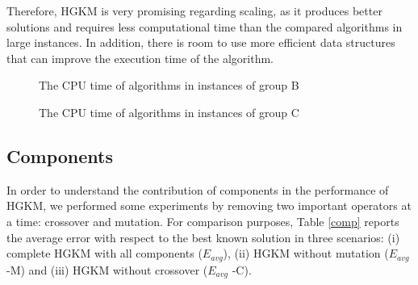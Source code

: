 Therefore, HGKM is very promising regarding scaling, as it produces better solutions and requires less computational time than the compared algorithms in large instances. In addition, there is room to use more efficient data structures that can improve the execution time of the algorithm.


\begin{figure}[H]
\centering
{}
\caption{The CPU time of algorithms in instances of group B}
\label{fig:sizeB}
\end{figure}

\begin{figure}[H]
\centering
{}
\caption{The CPU time of algorithms in instances of group C}
\label{fig:sizeC}
\end{figure}

\subsection{Components}
\label{sec:components-section}
In order to understand the contribution of components in the performance of HGKM, we performed some experiments by removing two important operators at a time: crossover and mutation. For comparison purposes, Table \ref{comp} reports the average error with respect to the best known solution in three scenarios: (i) complete HGKM with all components ($E_{avg}$), (ii) HGKM without mutation ($E_{avg}$ -M) and (iii) HGKM without crossover ($E_{avg}$ -C).

\small{}

